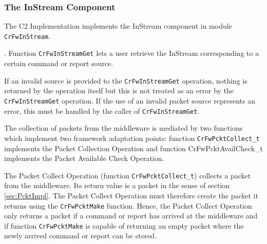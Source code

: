\documentclass{pnp_article}
\begin{document}
\subsubsection{The InStream Component}\label{sec:InStream}


The C2 Implementation implements the InStream component in module \texttt{CrFwInStream}.  

. Function \texttt{CrFwInStreamGet} lets a user retrieve the InStream corresponding to a certain command or report source. 

If an invalid source is provided to the \texttt{CrFwInStreamGet} operation, nothing is returned by the operation itself but this is not treated as an error by the \texttt{CrFwInStreamGet} operation. If the use of an invalid packet source represents an error, this must be handled by the caller of \texttt{CrFwInStreamGet}. 

The collection of packets from the middleware is mediated by two functions which implement two framework adaptation points: function \texttt{CrFwPcktCollect\_t} implements the Packet Collection Operation and function CrFwPcktAvailCheck\_t implements the Packet Available Check Operation. 

The Packet Collect Operation (function \texttt{CrFwPcktCollect\_t}) collects a packet from the middleware. Its return value is a packet in the sense of section \ref{sec:PcktImpl}. The Packet Collect Operation must therefore create the packet it returns using the \texttt{CrFwPcktMake} function. Hence, the Packet Collect Operation only returns a packet if a command or report has arrived at the middleware and if function \texttt{CrFwPcktMake} is capable of returning an empty packet where the newly arrived command or report can be stored. 
\end{document}
